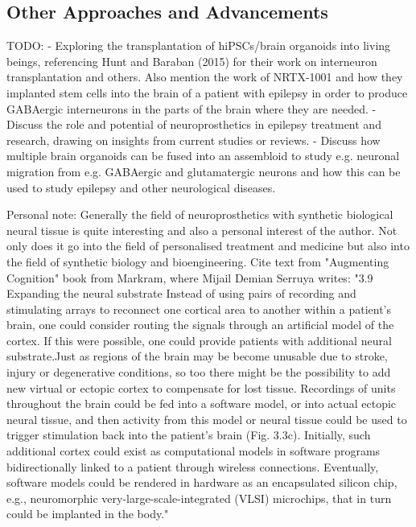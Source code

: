 \documentclass[10pt]{article}
\begin{document}
\begin{sloppypar}
  \subsection{Other Approaches and Advancements}
  \label{sec:other-approaches-and-advancements}

  TODO:
  - Exploring the transplantation of hiPSCs/brain organoids into living beings, referencing Hunt and Baraban (2015) for their work on interneuron transplantation and others. Also mention the work of NRTX-1001 and how they implanted stem cells into the brain of a patient with epilepsy in order to produce GABAergic interneurons in the parts of the brain where they are needed.
  - Discuss the role and potential of neuroprosthetics in epilepsy treatment and research, drawing on insights from current studies or reviews.
  - Discuss how multiple brain organoids can be fused into an assembloid to study e.g. neuronal migration from e.g. GABAergic and glutamatergic neurons and how this can be used to study epilepsy and other neurological diseases.

  Personal note: Generally the field of neuroprosthetics with synthetic biological neural tissue is quite interesting and also a personal interest of the author. Not only does it go into the field of personalised treatment and medicine but also into the field of synthetic biology and bioengineering. Cite text from "Augmenting Cognition" book from Markram, where Mijail Demian Serruya writes: "3.9 Expanding the neural substrate  Instead of using pairs of recording and stimulating arrays to reconnect one cortical area to another within a patient’s brain, one could  consider routing the signals through an artificial model of the cortex.  If this were possible, one could provide patients with additional neural substrate.Just as regions of the brain may be become unusable due  to stroke, injury or degenerative conditions, so too there might be the  possibility to add new virtual or ectopic cortex to compensate for lost  tissue. Recordings of units throughout the brain could be fed into a  software model, or into actual ectopic neural tissue, and then activity from this model or neural tissue could be used to trigger stimulation back into the patient’s brain (Fig. 3.3c). Initially, such additional cortex could exist as computational models in software programs  bidirectionally linked to a patient through wireless connections. Eventually, software models could be rendered in hardware as an encapsulated silicon chip, e.g., neuromorphic very-large-scale-integrated  (VLSI) microchips, that in turn could be implanted in the body."


\end{sloppypar}
\end{document}
